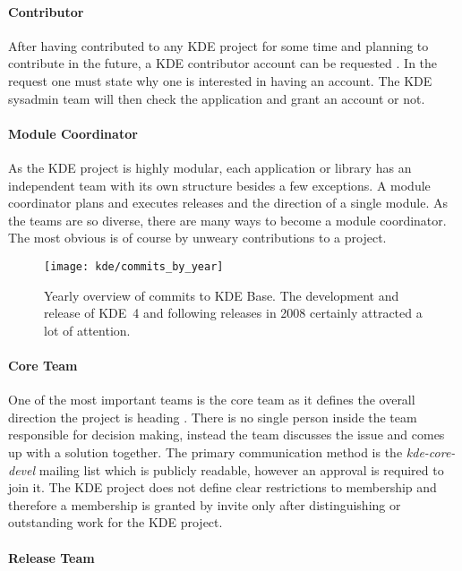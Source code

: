 \paragraph{Contributor}

After having contributed to any KDE project for some time and planning to
contribute in the future, a KDE contributor account can be requested
\cite{KDEContribute,KDEContributor}. In the request one must state why one is
interested in having an account. The KDE sysadmin team will then check the
application and grant an account or not.

\paragraph{Module Coordinator}

As the KDE project is highly modular, each application or library has an
independent team with its own structure besides a few exceptions. A module
coordinator plans and executes releases and the direction of a single module.
As the teams are so diverse, there are many ways to become a module
coordinator. The most obvious is of course by unweary contributions to a
project.

\begin{figure}[htbp]
  \centering
  \texttt{[image: kde/commits\_by\_year]}
  \caption[Commits by Year, KDE]
  {Yearly overview of commits to KDE Base. The development and release of KDE~4
    and following releases in 2008 certainly attracted a lot of attention.}
\end{figure}

\paragraph{Core Team}

One of the most important teams is the core team as it defines the overall
direction the project is heading \cite{KDEProjectManagement}. There is no
single person inside the team responsible for decision making, instead the team
discusses the issue and comes up with a solution together. The primary
communication method is the \emph{kde-core-devel} mailing list which is
publicly readable, however an approval is required to join it. The KDE project
does not define clear restrictions to membership and therefore a membership is
granted by invite only after distinguishing or outstanding work for the KDE
project.

\paragraph{Release Team}

